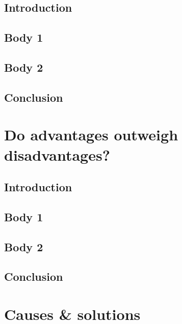 \documentclass[11pt,a4paper]{article}
\begin{document}
\subsection*{Introduction}
\vspace{1cm}
\subsection*{Body 1}
\vspace{1cm}
\subsection*{Body 2}
\vspace{1cm}
\subsection*{Conclusion}
\vspace{1cm}
\clearpage
\section*{Do advantages outweigh disadvantages?}
\subsection*{Introduction}
\vspace{1cm}
\subsection*{Body 1}
\vspace{1cm}
\subsection*{Body 2}
\vspace{1cm}
\subsection*{Conclusion}
\vspace{1cm}
\clearpage
\section*{Causes \& solutions}
\end{document}
